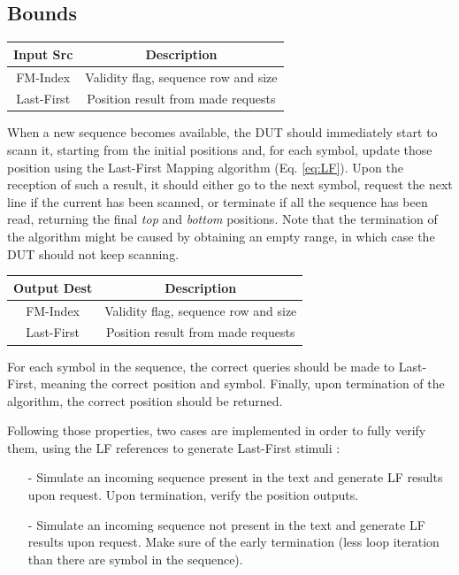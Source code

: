 \subsection{Bounds}
\vspace*{3mm}
\begin{center}
    \begin{tabular}{|c|c|}
\hline
  Input Src   &  Description \\
  \hline
   FM-Index  & Validity flag, sequence row and size \\
   Last-First & Position result from made requests \\
   \hline
\end{tabular}
\end{center}
\vspace*{5mm}

When a new sequence becomes available, the DUT should immediately start to scann it, starting from the initial positions and, for each symbol, update those position using the Last-First Mapping algorithm (Eq. \ref{eq:LF}). Upon the reception of such a result, it should either go to the next symbol, request the next line if the current has been scanned, or terminate if all the sequence has been read, returning the final \textsl{top} and \textsl{bottom} positions. Note that the termination of the algorithm might be caused by obtaining an empty range, in which case the DUT should not keep scanning. \\
\begin{center}
\begin{tabular}{|c|c|}
\hline
  Output Dest   &  Description \\
  \hline
   FM-Index  & Validity flag, sequence row and size \\
   Last-First & Position result from made requests \\
   \hline
\end{tabular}
\end{center}
\vspace*{5mm}
For each symbol in the sequence, the correct queries should be made to Last-First, meaning the correct position and symbol. Finally, upon termination of the algorithm, the correct position should be returned.

Following those properties, two cases are implemented in order to fully verify them, using the LF references to generate Last-First stimuli :
\begin{itemize}
    \item [-] Simulate an incoming sequence present in the text and generate LF results upon request. Upon termination, verify the position outputs.
    \item [-]  Simulate an incoming sequence not present in the text and generate LF results upon request. Make sure of the early termination (less loop iteration than there are symbol in the sequence).
\end{itemize}

